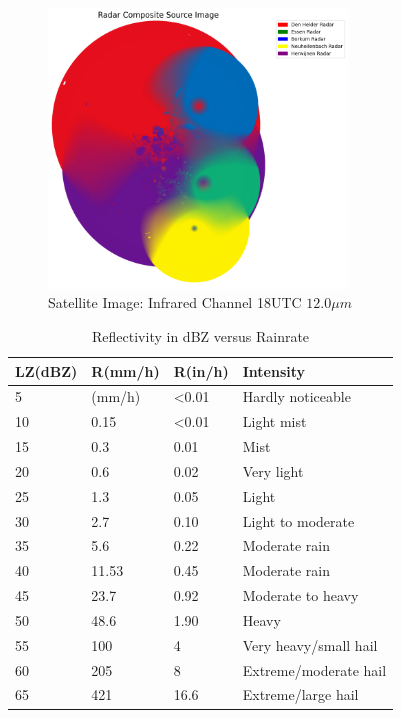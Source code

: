 \documentclass[acmtog, authorversion]{acmart}
\begin{document}
\begin{figure}
    \centering
    \includegraphics[width=225pt]{./images/radar_source.png}
    \caption{Satellite Image: Infrared Channel 18UTC $12.0\mu m$}
    \Description{}
    \label{fig:source}
\end{figure}


\begin{table}[h]
\caption{Reflectivity in dBZ versus Rainrate}
\begin{tabular}{@{}llll@{}}
\toprule
LZ(dBZ) & R(mm/h) & R(in/h)        & Intensity             \\ \midrule
5       & (mm/h)  & \textless 0.01 & Hardly noticeable     \\
10      & 0.15    & \textless 0.01 & Light mist            \\
15      & 0.3     & 0.01           & Mist                  \\
20      & 0.6     & 0.02           & Very light            \\
25      & 1.3     & 0.05           & Light                 \\
30      & 2.7     & 0.10           & Light to moderate     \\
35      & 5.6     & 0.22           & Moderate rain         \\
40      & 11.53   & 0.45           & Moderate rain         \\
45      & 23.7    & 0.92           & Moderate to heavy     \\
50      & 48.6    & 1.90           & Heavy                 \\
55      & 100     & 4              & Very heavy/small hail \\
60      & 205     & 8              & Extreme/moderate hail \\
65      & 421     & 16.6           & Extreme/large hail    \\ \bottomrule
\end{tabular}
\end{table}
\end{document}
